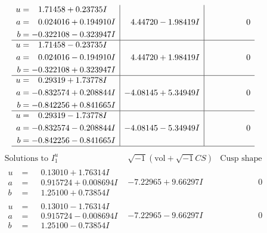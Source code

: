 \documentclass[1p]{elsarticle_modified}
\theoremstyle{definition}
\newcommand{\I}{\sqrt{-1}}
\begin{document}
$$\begin{array}{c|c|c}
\begin{aligned}
u &= \phantom{-}1.71458 + 0.23735 I \\
a &= \phantom{-}0.024016 + 0.194910 I \\
b &= -0.322108 - 0.323947 I\end{aligned}
 & \phantom{-}4.44720 - 1.98419 I & \phantom{-0.000000 } 0 \\ \hline\begin{aligned}
u &= \phantom{-}1.71458 - 0.23735 I \\
a &= \phantom{-}0.024016 - 0.194910 I \\
b &= -0.322108 + 0.323947 I\end{aligned}
 & \phantom{-}4.44720 + 1.98419 I & \phantom{-0.000000 } 0 \\ \hline\begin{aligned}
u &= \phantom{-}0.29319 + 1.73778 I \\
a &= -0.832574 + 0.208844 I \\
b &= -0.842256 + 0.841665 I\end{aligned}
 & -4.08145 + 5.34949 I & \phantom{-0.000000 } 0 \\ \hline\begin{aligned}
u &= \phantom{-}0.29319 - 1.73778 I \\
a &= -0.832574 - 0.208844 I \\
b &= -0.842256 - 0.841665 I\end{aligned}
 & -4.08145 - 5.34949 I & \phantom{-0.000000 } 0\\
 \hline 
 \end{array}$$\newpage$$\begin{array}{c|c|c}  
\text{Solutions to }I^u_{1}& \I (\text{vol} + \sqrt{-1}CS) & \text{Cusp shape}\\
 \hline 
\begin{aligned}
u &= \phantom{-}0.13010 + 1.76314 I \\
a &= \phantom{-}0.915724 + 0.008694 I \\
b &= \phantom{-}1.25100 + 0.73854 I\end{aligned}
 & -7.22965 + 9.66297 I & \phantom{-0.000000 } 0 \\ \hline\begin{aligned}
u &= \phantom{-}0.13010 - 1.76314 I \\
a &= \phantom{-}0.915724 - 0.008694 I \\
b &= \phantom{-}1.25100 - 0.73854 I\end{aligned}
 & -7.22965 - 9.66297 I & \phantom{-0.000000 } 0 \\ \hline\begin{aligned}

\end{aligned}
\end{array}$$
\end{document}
